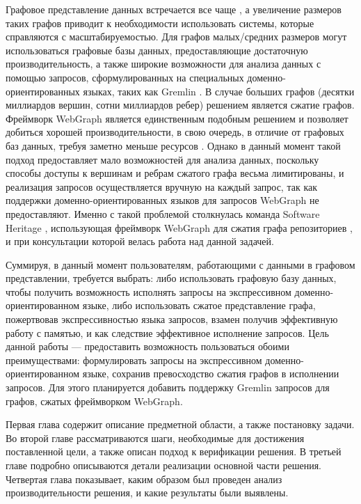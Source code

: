 \documentclass[times,specification,annotation]{itmo-student-thesis}
\begin{document}
Графовое представление данных встречается все чаще \cite{big-graphs-future-arxiv}, а увеличение размеров таких графов приводит к необходимости использовать системы, которые справляются с масштабируемостью. Для графов малых/средних размеров могут использоваться графовые базы данных, предоставляющие достаточную производительность, а также широкие возможности для анализа данных с помощью запросов, сформулированных на специальных доменно-ориентированных языках, таких как Gremlin \cite{gremlin}. В случае больших графов (десятки миллиардов вершин, сотни миллиардов ребер) решением является сжатие графов. Фреймворк WebGraph \cite{webgraph} является единственным подобным решением и позволяет добиться хорошей производительности, в свою очередь, в отличие от графовых баз данных, требуя заметно меньше ресурсов \cite{graph-db-scale, scale-cost, saner}. Однако в данный момент такой подход предоставляет мало возможностей для анализа данных, поскольку способы доступы к вершинам и ребрам сжатого графа весьма лимитированы, и реализация запросов осуществляется вручную на каждый запрос, так как поддержки доменно-ориентированных языков для запросов WebGraph не предоставляют. Именно с такой проблемой столкнулась команда Software Heritage \cite{swh-main-page, swh-intern}, использующая фреймворк WebGraph для сжатия графа репозиториев \cite{saner}, и при консультации которой велась работа над данной задачей.

Суммируя, в данный момент пользователям, работающими с данными в графовом представлении, требуется выбрать: либо использовать графовую базу данных, чтобы получить возможность исполнять запросы на экспрессивном доменно-ориентированном языке, либо использовать сжатое представление графа, пожертвовав экспрессивностью языка запросов, взамен получив эффективную работу с памятью, и как следствие эффективное исполнение запросов.
Цель данной работы --- предоставить возможность пользоваться обоими преимуществами: формулировать запросы на экспрессивном доменно-ориентированном языке, сохранив превосходство сжатия графов в исполнении запросов. Для этого планируется добавить поддержку Gremlin запросов для графов, сжатых фреймворком WebGraph.

Первая глава содержит описание предметной области, а также постановку задачи. Во второй главе рассматриваются шаги, необходимые для достижения поставленной цели, а также описан подход к верификации решения. В третьей главе подробно описываются детали реализации основной части решения. Четвертая глава показывает, каким образом был проведен анализ производительности решения, и какие результаты были выявлены.
\end{document}
